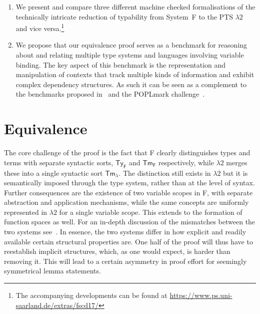 \documentclass[a4paper,UKenglish]{lipics-v2016}
\newcommand{\SysL}{$\lambda2$\xspace}
\newcommand{\TyF}{\ensuremath{\mathsf{Ty_{F}}}}
\newcommand{\TmF}{\ensuremath{\mathsf{Tm_{F}}}}
\newcommand{\TmL}{\ensuremath{\mathsf{Tm_{\lambda}}}}
\theoremstyle{plain}
\begin{document}
\begin{enumerate}
\item We present and compare three different machine checked formalisations of the technically intricate reduction of typability from System~F to the PTS \SysL and vice versa.\footnote{The accompanying developments can be found at \url{https://www.ps.uni-saarland.de/extras/fscd17/}}
\item We propose that our equivalence proof serves as a benchmark for reasoning about and relating multiple type systems and languages involving variable binding.
  The key aspect of this benchmark is the representation and manipulation of contexts that track multiple kinds of information and exhibit complex dependency structures.
  As such it can be seen as a complement to the benchmarks proposed in~\cite{Felty:ITP10,Felty:orbi-survey} and the POPLmark challenge~\cite{poplmark}.
\end{enumerate}

\section{Equivalence}
\label{sec:equi}

The core challenge of the proof is the fact that F clearly distinguishes types and terms with separate syntactic sorts, $\TyF$ and $\TmF$ respectively, while \SysL merges these into a single syntactic sort $\TmL$.
The distinction still exists in \SysL but it is semantically imposed through the type system, rather than at the level of syntax.
Further consequences are the existence of two variable scopes in F, with separate abstraction and application mechanisms, while the same concepts are uniformly represented in \SysL for a single variable scope.
This extends to the formation of function spaces as well.
For an in-depth discussion of the mismatches between the two systems see~\cite{KaiserEtAl:2017:sysf_pts_equiv_coq}.
In essence, the two systems differ in how explicit and readily available certain structural properties are.
One half of the proof will thus have to reestablish implicit structures, which, as one would expect, is harder than removing it.
This will lead to a certain asymmetry in proof effort for seemingly symmetrical lemma statements.
\end{document}
